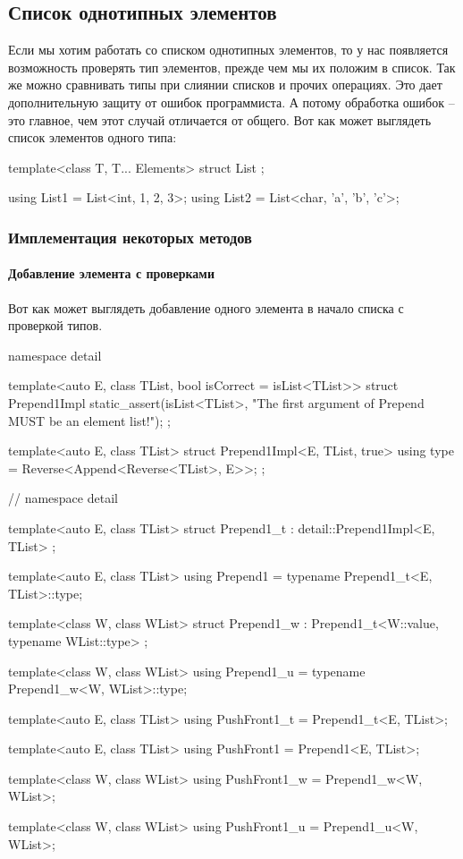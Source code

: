\subsection{Список однотипных элементов}

Если мы хотим работать со списком однотипных элементов, то у нас появляется возможность проверять тип элементов, прежде чем мы их положим в список.
Так же можно сравнивать типы при слиянии списков и прочих операциях.
Это дает дополнительную защиту от ошибок программиста.
А потому обработка ошибок -- это главное, чем этот случай отличается от общего.
Вот как может выглядеть список элементов одного типа:
\begin{cppcode}
template<class T, T... Elements>
struct List {};

using List1 = List<int, 1, 2, 3>;
using List2 = List<char, 'a', 'b', 'c'>;
\end{cppcode}

\subsubsection{Имплементация некоторых методов}
\label{section::EListImpl}

\paragraph{Добавление элемента с проверками}

Вот как может выглядеть добавление одного элемента в начало списка с проверкой типов.
\begin{cppcode}
namespace detail {
template<auto E, class TList, bool isCorrect = isList<TList>>
struct Prepend1Impl {
  static_assert(isList<TList>,
                "The first argument of Prepend MUST be an element list!");
};

template<auto E, class TList>
struct Prepend1Impl<E, TList, true> {
  using type = Reverse<Append<Reverse<TList>, E>>;
};
} // namespace detail

template<auto E, class TList>
struct Prepend1_t : detail::Prepend1Impl<E, TList> {};

template<auto E, class TList>
using Prepend1 = typename Prepend1_t<E, TList>::type;

template<class W, class WList>
struct Prepend1_w : Prepend1_t<W::value, typename WList::type> {};

template<class W, class WList>
using Prepend1_u = typename Prepend1_w<W, WList>::type;

template<auto E, class TList>
using PushFront1_t = Prepend1_t<E, TList>;

template<auto E, class TList>
using PushFront1 = Prepend1<E, TList>;

template<class W, class WList>
using PushFront1_w = Prepend1_w<W, WList>;

template<class W, class WList>
using PushFront1_u = Prepend1_u<W, WList>;
\end{cppcode}

